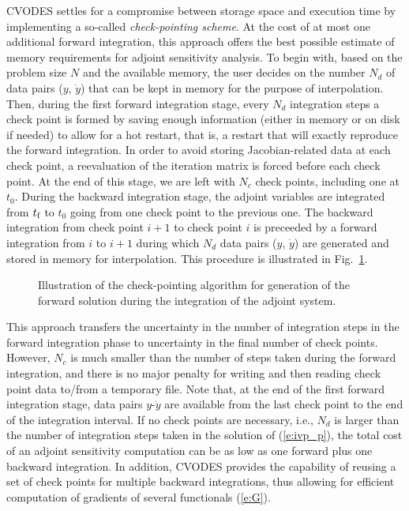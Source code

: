 CVODES settles for a compromise between storage space and execution time by
implementing a so-called {\em check-pointing scheme}. At the cost of
at most one additional forward integration, this approach offers the best possible 
estimate of memory requirements for adjoint sensitivity analysis. To begin with,
based on the problem size $N$ and the available memory, the user decides on 
the number $N_d$ of data pairs ($y$, ${\dot y}$) that can be kept in memory for 
the purpose of interpolation. Then, during the first forward integration stage, 
every $N_d$ integration steps a check point is formed by saving enough information
(either in memory or on disk if needed) to allow for a hot restart, that is, a restart
that will exactly reproduce the forward integration. In order to avoid storing
Jacobian-related data at each check point, a reevaluation of the iteration matrix
is forced before each check point. At the end of this stage, we are left with $N_c$ 
check points, including one at $t_0$.
During the backward integration stage, the adjoint variables are integrated
from $t_\mb{f}$ to $t_0$ going from one check point to the previous one.
The backward integration from check point $i+1$ to check point $i$ is preceeded
by a forward integration from $i$ to $i+1$ during which $N_d$ data pairs 
($y$, ${\dot y}$) are generated and stored in memory for interpolation.
%
This procedure is illustrated in Fig.~\ref{f:ckpnt}.
%
\begin{figure}
\centerline{}
\caption {Illustration of the check-pointing algorithm for generation of 
  the forward solution during the integration of the adjoint system.}
\label{f:ckpnt}
\end{figure}

This approach transfers the uncertainty in the number of integration
steps in the forward integration phase to uncertainty in the final number of check 
points. However, $N_c$ is much smaller than the number of steps taken during
the forward integration, and there is no major penalty for writing and then reading
check point data to/from a temporary file.
%
Note that, at the end of the first forward integration stage, data pairs 
$y$-${\dot y}$ are available from the last check point to the end of the integration 
interval. If no check points are necessary, i.e., $N_d$ is larger than the 
number of integration steps taken in the solution of (\ref{e:ivp_p}),
the total cost of an adjoint sensitivity computation can be as low as one forward
plus one backward integration.
%
In addition, CVODES provides the capability of reusing a set of check points
for multiple backward integrations, thus allowing for efficient computation of
gradients of several functionals (\ref{e:G}).

